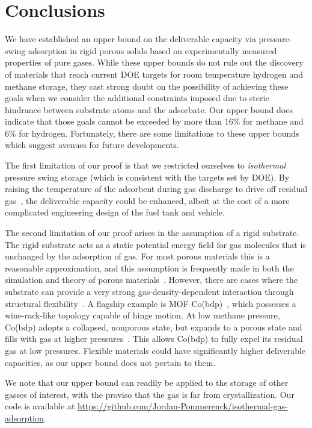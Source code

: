 \documentclass[twoside,twocolumn,9pt]{article}
\begin{document}
\section{Conclusions}
We have established an upper bound on the deliverable capacity via
pressure-swing adsorption in rigid porous solids based on experimentally
measured properties of pure gases. While these upper bounds do not rule out the
discovery of materials that reach current DOE targets for room temperature hydrogen and methane storage, they cast strong doubt
on the possibility of achieving these goals when we consider the additional
constraints imposed due to steric hindrance between substrate atoms and the
adsorbate. Our upper bound does indicate that those goals cannot be exceeded by
more than 16\% for methane and 6\% for hydrogen. Fortunately, there are some
limitations to these upper bounds which suggest avenues for future developments.

The first limitation of our proof is that we restricted ourselves to
\emph{isothermal} pressure swing storage (which is consistent with the targets set by DOE). By raising the temperature of the
adsorbent during gas discharge to drive off residual
gas~\cite{gomez2014exploring}, the deliverable capacity could be enhanced,
albeit at the cost of a more complicated engineering design of the fuel tank
and vehicle.

The second limitation of our proof arises in the assumption of a rigid
substrate. The rigid substrate acts as a static potential energy field for gas
molecules that is unchanged by the adsorption of gas. For most porous materials
this is a reasonable approximation, and this assumption is frequently made in
both the simulation and theory of porous materials~\cite{duren2009using}.
However, there are cases where the substrate can provide a very strong
gas-density-dependent interaction through structural
flexibility~\cite{schneemann2014flexible}. A flagship example is MOF
Co(bdp)~\cite{choi2008broadly}, which possesses a wine-rack-like topology
capable of hinge motion. At low methane pressure, Co(bdp) adopts a collapsed,
nonporous state, but expands to a porous state and fills with gas at higher
pressures~\cite{mason2015methane}. This allows Co(bdp) to fully expel its
residual gas at low pressures. Flexible materials could have significantly 
higher deliverable capacities, as our upper bound does not pertain to them.

We note that our upper bound can readily be applied to the storage of other
gasses of interest, with the proviso that the gas is far from crystallization.
Our code is available at \href{https://github.com/Jordan-Pommerenck/isothermal-gas-adsorption}{https://github.com/Jordan-Pommerenck/isothermal-gas-adsorption}.
\end{document}
